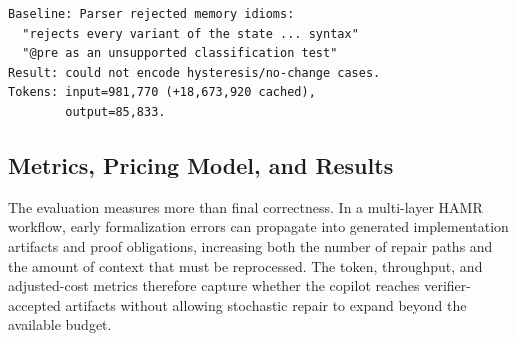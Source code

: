 \documentclass[conference]{IEEEtran}
\begin{document}
\begin{lstlisting}[caption={Condensed baseline failure excerpt: parser rejection and high token usage.}, label={list:failureLog}, float=t]
Baseline: Parser rejected memory idioms:
  "rejects every variant of the state ... syntax"
  "@pre as an unsupported classification test"
Result: could not encode hysteresis/no-change cases.
Tokens: input=981,770 (+18,673,920 cached),
        output=85,833.
\end{lstlisting}


\subsection{Metrics, Pricing Model, and Results}
\label{sec:evaluation}
The evaluation measures more than final correctness. In a multi-layer HAMR workflow, early formalization errors can propagate into generated implementation artifacts and proof obligations, increasing both the number of repair paths and the amount of context that must be reprocessed. The token, throughput, and adjusted-cost metrics therefore capture whether the copilot reaches verifier-accepted artifacts without allowing stochastic repair to expand beyond the available budget.
\end{document}
